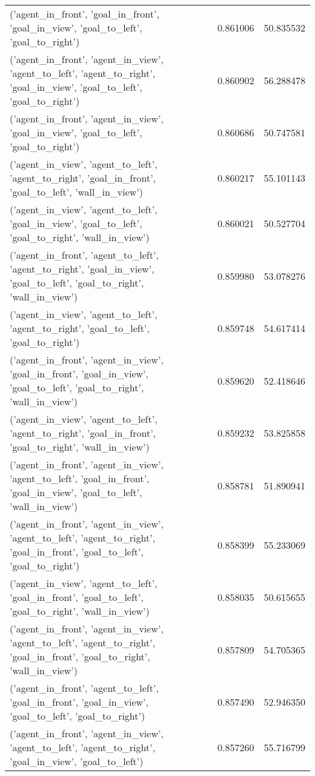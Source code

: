 \begin{tabular}{lrr}
('agent\_in\_front', 'goal\_in\_front', 'goal\_in\_view', 'goal\_to\_left', 'goal\_to\_right') & 0.861006 & 50.835532 \\
('agent\_in\_front', 'agent\_in\_view', 'agent\_to\_left', 'agent\_to\_right', 'goal\_in\_view', 'goal\_to\_left', 'goal\_to\_right') & 0.860902 & 56.288478 \\
('agent\_in\_front', 'agent\_in\_view', 'goal\_in\_view', 'goal\_to\_left', 'goal\_to\_right') & 0.860686 & 50.747581 \\
('agent\_in\_view', 'agent\_to\_left', 'agent\_to\_right', 'goal\_in\_front', 'goal\_to\_left', 'wall\_in\_view') & 0.860217 & 55.101143 \\
('agent\_in\_view', 'agent\_to\_left', 'goal\_in\_view', 'goal\_to\_left', 'goal\_to\_right', 'wall\_in\_view') & 0.860021 & 50.527704 \\
('agent\_in\_front', 'agent\_to\_left', 'agent\_to\_right', 'goal\_in\_view', 'goal\_to\_left', 'goal\_to\_right', 'wall\_in\_view') & 0.859980 & 53.078276 \\
('agent\_in\_view', 'agent\_to\_left', 'agent\_to\_right', 'goal\_to\_left', 'goal\_to\_right') & 0.859748 & 54.617414 \\
('agent\_in\_front', 'agent\_in\_view', 'goal\_in\_front', 'goal\_in\_view', 'goal\_to\_left', 'goal\_to\_right', 'wall\_in\_view') & 0.859620 & 52.418646 \\
('agent\_in\_view', 'agent\_to\_left', 'agent\_to\_right', 'goal\_in\_front', 'goal\_to\_right', 'wall\_in\_view') & 0.859232 & 53.825858 \\
('agent\_in\_front', 'agent\_in\_view', 'agent\_to\_left', 'goal\_in\_front', 'goal\_in\_view', 'goal\_to\_left', 'wall\_in\_view') & 0.858781 & 51.890941 \\
('agent\_in\_front', 'agent\_in\_view', 'agent\_to\_left', 'agent\_to\_right', 'goal\_in\_front', 'goal\_to\_left', 'goal\_to\_right') & 0.858399 & 55.233069 \\
('agent\_in\_view', 'agent\_to\_left', 'goal\_in\_front', 'goal\_to\_left', 'goal\_to\_right', 'wall\_in\_view') & 0.858035 & 50.615655 \\
('agent\_in\_front', 'agent\_in\_view', 'agent\_to\_left', 'agent\_to\_right', 'goal\_in\_front', 'goal\_to\_right', 'wall\_in\_view') & 0.857809 & 54.705365 \\
('agent\_in\_front', 'agent\_to\_left', 'goal\_in\_front', 'goal\_in\_view', 'goal\_to\_left', 'goal\_to\_right') & 0.857490 & 52.946350 \\
('agent\_in\_front', 'agent\_in\_view', 'agent\_to\_left', 'agent\_to\_right', 'goal\_in\_view', 'goal\_to\_left') & 0.857260 & 55.716799 \\

\end{tabular}

